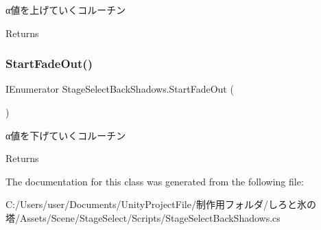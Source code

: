 α値を上げていくコルーチン 

\begin{DoxyReturn}{Returns}

\end{DoxyReturn}
\mbox{\label{class_stage_select_back_shadows_afd22cce3c06d1a0710729861de03d627}} 
\subsubsection{\texorpdfstring{Start\+Fade\+Out()}{StartFadeOut()}}
{\footnotesize\ttfamily I\+Enumerator Stage\+Select\+Back\+Shadows.\+Start\+Fade\+Out (\begin{DoxyParamCaption}{ }\end{DoxyParamCaption})\hspace{0.3cm}{\ttfamily [inline]}}



α値を下げていくコルーチン 

\begin{DoxyReturn}{Returns}

\end{DoxyReturn}


The documentation for this class was generated from the following file\+:\begin{DoxyCompactItemize}
\item 
C\+:/\+Users/user/\+Documents/\+Unity\+Project\+File/制作用フォルダ/しろと氷の塔/\+Assets/\+Scene/\+Stage\+Select/\+Scripts/Stage\+Select\+Back\+Shadows.\+cs\end{DoxyCompactItemize}
